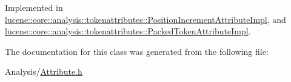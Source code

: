 Implemented in \mbox{\hyperlink{classlucene_1_1core_1_1analysis_1_1tokenattributes_1_1PositionIncrementAttributeImpl_a7e1d05c2dab9f80a43df0def33f71c27}{lucene\+::core\+::analysis\+::tokenattributes\+::\+Position\+Increment\+Attribute\+Impl}}, and \mbox{\hyperlink{classlucene_1_1core_1_1analysis_1_1tokenattributes_1_1PackedTokenAttributeImpl_a657933594f71883a7271bca05363bc2a}{lucene\+::core\+::analysis\+::tokenattributes\+::\+Packed\+Token\+Attribute\+Impl}}.



The documentation for this class was generated from the following file\+:\begin{DoxyCompactItemize}
\item 
Analysis/\mbox{\hyperlink{Analysis_2Attribute_8h}{Attribute.\+h}}\end{DoxyCompactItemize}
